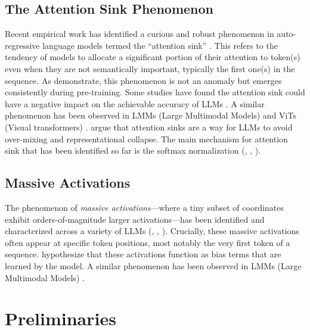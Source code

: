 \documentclass[11pt]{article}
\begin{document}
\subsection{The Attention Sink Phenomenon}
Recent empirical work has identified a curious and robust phenomenon in auto-regressive language models termed the ``attention sink'' \citep{xiao2023efficient}. This refers to the tendency of models to allocate a significant portion of their attention to token(s) even when they are not semantically important, typically the first one(s) in the sequence.
As \citet{gu2025when} demonstrate, this phenomenon is not an anomaly but emerges consistently during pre-training. Some studies have found the attention sink could have a negative impact on the achievable accuracy of LLMs \cite{Yu2024Unveiling}. 
A similar phenomenon has been observed in LMMs (Large Multimodal Models) \cite{Kang2025See} and ViTs (Visual transformers) \citet{Feng2025EDIT:}. \citet {Barbero2025Why} argue that attention sinks are a
way for LLMs to avoid over-mixing and representational collapse. The main mechanism for attention sink that has been identified so far is the softmax normalization (\citet{xiao2023efficient}, \citet{gu2025when}, \citet{Zuhri2025SoftpickNA}).

\subsection{Massive Activations}
The phenomenon of \emph{massive activations}—where a tiny subset of coordinates exhibit orders-of-magnitude larger activations—has been identified and characterized across a variety of LLMs (\cite{sun2024massive}, \cite{lindnielsen2024spectral}, \cite{lin2024duquant}). Crucially, these massive activations often appear at specific token positions, most notably the very first token of a sequence. \cite{sun2024massive} hypothesize that these activations function as bias terms that are learned by the model. A similar phenomenon has been observed in LMMs (Large Multimodal Models) \cite{Kang2025See}.


\section{Preliminaries}
\end{document}

